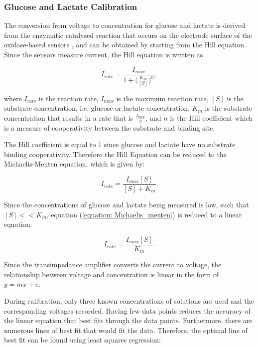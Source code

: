 \subsubsection{Glucose and Lactate Calibration}

The conversion from voltage to concentration for glucose and lactate is derived from the enzymatic catalysed reaction that occurs on the electrode surface of the oxidase-based sensors \cite{Patel2011, Rogers2017}, and can be obtained by starting from the Hill equation. Since the sensors measure current, the Hill equation is written as

\begin{equation}
    I_{rate} = \frac{I_{max}}{1 + \big( \frac{K_{m}}{[S]} \big)^{n}},
    \label{equation: Hill equation}
\end{equation}

\noindent where $I_{rate}$ is the reaction rate, $I_{max}$ is the maximum reaction rate, $[S]$ is the substrate concentration, i.e. glucose or lactate concentration, $K_{m}$ is the substrate concentration that results in a rate that is $\frac{I_{max}}{2}$, and $n$ is the Hill coefficient which is a measure of cooperativity between the substrate and binding site.

The Hill coefficient is equal to 1 since glucose and lactate have no substrate binding cooperativity. Therefore the Hill Equation can be reduced to the Michaelis-Menten equation, which is given by:

\begin{equation}
    I_{rate} = \frac{I_{max}[S]}{[S] + K_{m}}.
    \label{equation: Michaelis_menten}
\end{equation}

Since the concentrations of glucose and lactate being measured is low, such that $[S] << K_{m}$, equation (\ref{equation: Michaelis_menten}) is reduced to a linear equation:

\begin{equation}
    I_{rate} = \frac{I_{max}[S]}{K_{m}}.
    \label{equation: reduced Michaelis_menten}
\end{equation}

\noindent Since the transimpedance amplifier converts the current to voltage, the relationship between voltage and concentration is linear in the form of $y = mx + c$.

During calibration, only three known concentrations of solutions are used and the corresponding voltages recorded. Having few data points reduces the accuracy of the linear equation that best fits through the data points. Furthermore, there are numerous lines of best fit that would fit the data. Therefore, the optimal line of best fit can be found using least squares regression:

